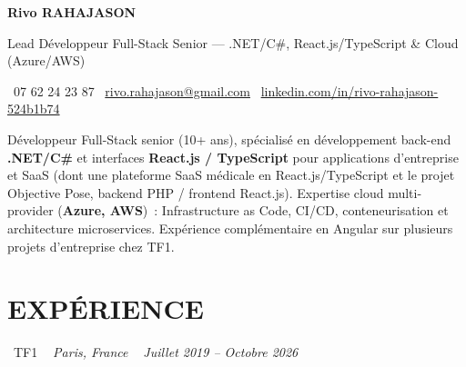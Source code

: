 \documentclass[10pt,a4paper]{article}
\begin{document}
\begin{center}
{\Huge \textbf{\color{ink}Rivo RAHAJASON}}

\vspace{4pt}

{\large \color{primary} Lead Développeur Full-Stack Senior --- .NET/C\#, React.js/TypeScript \& Cloud (Azure/AWS)}

\vspace{6pt}

\color{darkgray} \faPhone\  07 62 24 23 87 \quad
\color{darkgray} \faEnvelope\ \href{mailto:rivo.rahajason@gmail.com}{rivo.rahajason@gmail.com} \quad
\color{darkgray} \faLinkedin\ \href{https://linkedin.com/in/rivo-rahajason-524b1b74}{linkedin.com/in/rivo-rahajason-524b1b74}

\vspace{10pt}

\begin{minipage}{\textwidth}
\small\color{darkgray}
Développeur Full-Stack senior (10+ ans), spécialisé en développement back-end \textbf{.NET/C\#} et interfaces \textbf{React.js / TypeScript} pour applications d'entreprise et SaaS (dont une plateforme SaaS médicale en React.js/TypeScript et le projet Objective Pose, backend PHP / frontend React.js). Expertise cloud multi-provider (\textbf{Azure, AWS})~: Infrastructure as Code, CI/CD, conteneurisation et architecture microservices. Expérience complémentaire en Angular sur plusieurs projets d'entreprise chez TF1.
\end{minipage}

\vspace{16pt}
\end{center}

\section*{EXPÉRIENCE}

\noindent\textcolor{primary}{ \faBuilding\ TF1} \quad
\textit{ \small \textcolor{darkgray}{ \faMapMarker\ } Paris, France } \hfill
\textit{ \small \textcolor{darkgray}{ \faCalendar\ } Juillet 2019 -- Octobre 2026 }

\vspace{4pt}
\end{document}
